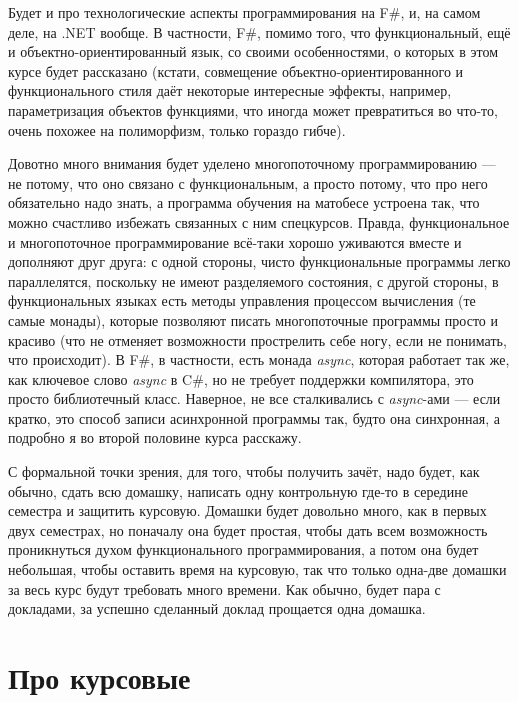 \documentclass[a5paper]{article}
\begin{document}
Будет и про технологические аспекты программирования на F\#, и, на самом деле, на .NET вообще. В частности, F\#, помимо того, что функциональный, ещё и объектно-ориентированный язык, со своими особенностями, о которых в этом курсе будет рассказано (кстати, совмещение объектно-ориентированного и функционального стиля даёт некоторые интересные эффекты, например, параметризация объектов функциями, что иногда может превратиться во что-то, очень похожее на полиморфизм, только гораздо гибче).

Довотно много внимания будет уделено многопоточному программированию --- не потому, что оно связано с функциональным, а просто потому, что про него обязательно надо знать, а программа обучения на матобесе устроена так, что можно счастливо избежать связанных с ним спецкурсов. Правда, функциональное и многопоточное программирование всё-таки хорошо уживаются вместе и дополняют друг друга: с одной стороны, чисто функциональные программы легко параллелятся, поскольку не имеют разделяемого состояния, с другой стороны, в функциональных языках есть методы управления процессом вычисления (те самые монады), которые позволяют писать многопоточные программы просто и красиво (что не отменяет возможности прострелить себе ногу, если не понимать, что происходит). В F\#, в частности, есть монада \textit{async}, которая работает так же, как ключевое слово \textit{async} в C\#, но не требует поддержки компилятора, это просто библиотечный класс. Наверное, не все сталкивались с \textit{async}-ами --- если кратко, это способ записи асинхронной программы так, будто она синхронная, а подробно я во второй половине курса расскажу.

С формальной точки зрения, для того, чтобы получить зачёт, надо будет, как обычно, сдать всю домашку, написать одну контрольную где-то в середине семестра и защитить курсовую. Домашки будет довольно много, как в первых двух семестрах, но поначалу она будет простая, чтобы дать всем возможность проникнуться духом функционального программирования, а потом она будет небольшая, чтобы оставить время на курсовую, так что только одна-две домашки за весь курс будут требовать много времени. Как обычно, будет пара с докладами, за успешно сделанный доклад прощается одна домашка.

\section{Про курсовые}
\end{document}
